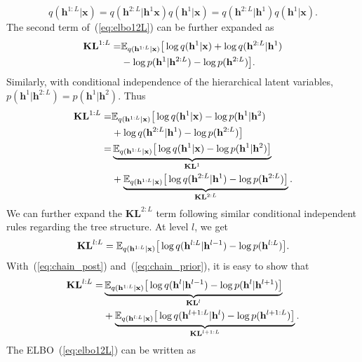 \documentclass[sigconf, anonymous, review]{acmart}
\theoremstyle{plain}
\theoremstyle{definition}
\theoremstyle{remark}
\begin{document}
$$q(\mathbf{h}^{1:L}|\mathbf{x})=q(\mathbf{h}^{2:L}|\mathbf{h}^1\mathbf{x})q(\mathbf{h}^{1}|\mathbf{x})=q(\mathbf{h}^{2:L}|\mathbf{h}^1)q(\mathbf{h}^{1}|\mathbf{x}).$$
The second term of~(\ref{eq:elbo12L}) can be further expanded as 
 \begin{align} \notag 
\textbf{\text{KL}}^{1:L} =&  \mathbb{E}_{q(\mathbf{h}^{1:L}|\mathbf{x})}\big[  \log q(\mathbf{h}^{1}|\mathbf{x})   +  \log q(\mathbf{h}^{2:L}|\mathbf{h}^{1})  \\
& - \log p(\mathbf{h}^{1}|\mathbf{h}^{2:L}) - \log p(\mathbf{h}^{2:L})  \big].
\end{align}%
Similarly, with conditional independence of the hierarchical latent variables, $ p(\mathbf{h}^{1}|\mathbf{h}^{2:L})= p(\mathbf{h}^{1}|\mathbf{h}^{2})$. Thus
 \begin{align} \notag 
\textbf{\text{KL}}^{1:L} =&  \mathbb{E}_{q(\mathbf{h}^{1:L}|\mathbf{x})}\big[  \log q(\mathbf{h}^{1}|\mathbf{x})   - \log p(\mathbf{h}^{1}|\mathbf{h}^{2})  \\  \notag
&+  \log q(\mathbf{h}^{2:L}|\mathbf{h}^{1})- \log p(\mathbf{h}^{2:L})  \big]\\ \notag
=&  \underbrace{\mathbb{E}_{q(\mathbf{h}^{1:L}|\mathbf{x})}\big[  \log q(\mathbf{h}^{1}|\mathbf{x})   - \log p(\mathbf{h}^{1}|\mathbf{h}^{2}) \big]}_{\mathbf{KL}^1}   \\ \notag
& + \underbrace{\mathbb{E}_{q(\mathbf{h}^{1:L}|\mathbf{x})}\big[  \log q(\mathbf{h}^{2:L}|\mathbf{h}^{1})- \log p(\mathbf{h}^{2:L})  \big]}_{\mathbf{KL}^{2:L}}.
\end{align}%
We can further expand the $\mathbf{KL}^{2:L}$ term following similar conditional independent rules regarding the tree structure.
At level $l$, we get
$$\textbf{\text{KL}}^{l:L} 
= \mathbb{E}_{q(\mathbf{h}^{1:L}|\mathbf{x})}\big[  \log q(\mathbf{h}^{l:L}|\mathbf{h}^{l-1})- \log p(\mathbf{h}^{l:L})  \big].$$
With~(\ref{eq:chain_post}) and~(\ref{eq:chain_prior}), it is easy to show that
 \begin{align} \label{eq:kl_lL}
\textbf{\text{KL}}^{l:L} 
=&  \underbrace{\mathbb{E}_{q(\mathbf{h}^{1:L}|\mathbf{x})}\big[  \log q(\mathbf{h}^{l}|\mathbf{h}^{l-1})   - \log p(\mathbf{h}^{l}|\mathbf{h}^{l+1}) \big]}_{\mathbf{KL}^l} \notag \\
&+ \underbrace{\mathbb{E}_{q(\mathbf{h}^{l:L}|\mathbf{x})}\big[  \log q(\mathbf{h}^{l+1:L}|\mathbf{h}^{l})- \log p(\mathbf{h}^{l+1:L})  \big]}_{\mathbf{KL}^{l+1:L}}.
\end{align}%
The ELBO~(\ref{eq:elbo12L}) can be written as 
\end{document}
